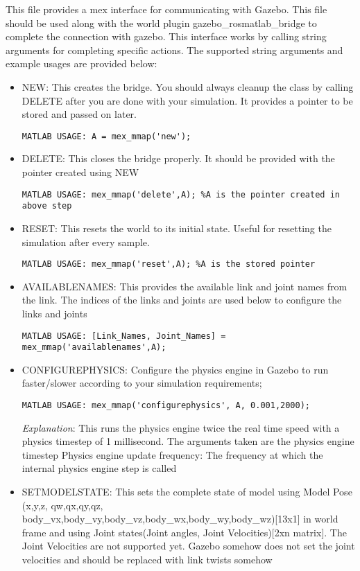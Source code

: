 \documentclass[letterpaper,10pt]{article}
\begin{document}
This file provides a mex interface for communicating with Gazebo. This
file should be used along with the world plugin
gazebo\_rosmatlab\_bridge to complete the connection with gazebo. This
interface works by calling string arguments for completing specific
actions. The supported string arguments and example usages are provided
below: 
\begin{itemize}
\item NEW: This creates the bridge. You should always cleanup the
class by calling DELETE after you are done with your simulation. It
provides a pointer to be stored and passed on later.

\begin{Verbatim}[frame=single]
             MATLAB USAGE: A = mex_mmap('new');
\end{Verbatim}

\item
  DELETE: This closes the bridge properly. It should be provided with
  the pointer created using NEW

\begin{Verbatim}[frame=single]
        MATLAB USAGE: mex_mmap('delete',A); %A is the pointer created in above step
\end{Verbatim}
\item
  RESET: This resets the world to its initial state. Useful for
  resetting the simulation after every sample.

\begin{Verbatim}[frame=single]
        MATLAB USAGE: mex_mmap('reset',A); %A is the stored pointer
\end{Verbatim}
\item
  AVAILABLENAMES: This provides the available link and joint names from
  the link. The indices of the links and joints are used below to
  configure the links and joints

\begin{Verbatim}[frame=single]
        MATLAB USAGE: [Link_Names, Joint_Names] = mex_mmap('availablenames',A);
\end{Verbatim}
\item
  CONFIGUREPHYSICS: Configure the physics engine in Gazebo to run
  faster/slower according to your simulation requirements;

\begin{Verbatim}[frame=single]
        MATLAB USAGE: mex_mmap('configurephysics', A, 0.001,2000); 

\end{Verbatim}
        \textit{Explanation}: This runs the physics engine twice the real time speed with a physics timestep of 1 millisecond. The arguments taken are the physics engine timestep 
        Physics engine update frequency: The frequency at which the internal physics engine step is called
\item
  SETMODELSTATE: This sets the complete state of model using Model Pose
  (x,y,z, qw,qx,qy,qz,
  body\_vx,body\_vy,body\_vz,body\_wx,body\_wy,body\_wz){[}13x1{]} in
  world frame and using Joint states(Joint angles, Joint
  Velocities){[}2xn matrix{]}. %
  The Joint Velocities are not supported yet. Gazebo somehow does not set the joint velocities and
  should be replaced with link twists somehow


\end{itemize}
\end{document}
